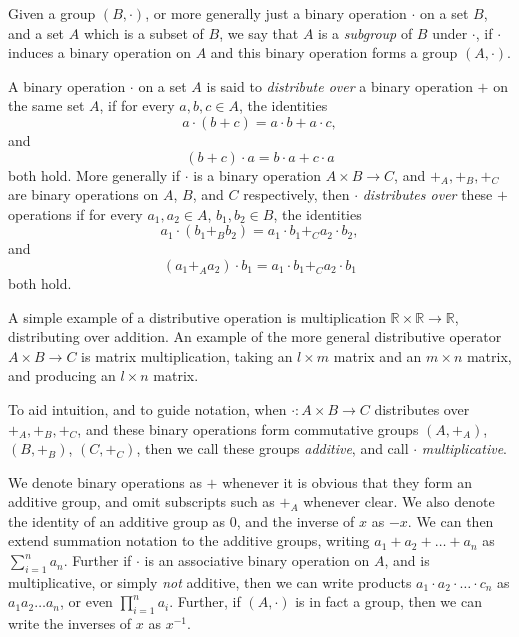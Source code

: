 \begin{define}[Subgroups] Given a group $(B, \cdot)$, or more generally just a binary operation $\cdot$ on a set $B$, and a set $A$ which is a subset of $B$, we say that $A$ is a \emph{subgroup} of $B$ under $\cdot$, if $\cdot$ induces a binary operation on $A$ and this binary operation forms a group $(A, \cdot)$.
\end{define}

\begin{define}[Distributivity] A binary operation $\cdot$ on a set $A$ is said to \emph{distribute over} a binary operation $+$ on the same set $A$, if for every $a, b, c \in A$, the identities
\[a \cdot (b + c) = a\cdot b +a\cdot c,\]
and
\[(b + c) \cdot a = b \cdot a + c \cdot a\]
both hold. More generally if $\cdot$ is a binary operation $A \times B \to C$, and $+_A, +_B, +_C$ are binary operations on $A$, $B$, and $C$ respectively, then $\cdot$ \emph{distributes over} these $+$ operations if for every $a_1, a_2 \in A$, $b_1, b_2 \in B$, the identities
\[a_1 \cdot (b_1 +_B b_2) = a_1 \cdot b_1 +_C a_2 \cdot b_2,\]
and
\[(a_1+_A a_2)\cdot b_1 = a_1 \cdot b_1 +_C a_2 \cdot b_1\]
both hold.
\end{define}

A simple example of a distributive operation is multiplication $\mathbb{R} \times \mathbb{R} \to \mathbb{R}$, distributing over addition. An example of the more general distributive operator $A \times B \to C$ is matrix multiplication, taking an $l \times m$ matrix and an $m \times n$ matrix, and producing an $l \times n$ matrix.

\begin{define} To aid intuition, and to guide notation, when $\cdot: A \times B \to C$ distributes over $+_A, +_B, +_C$, and these binary operations form commutative groups $(A, +_A)$, $(B, +_B)$, $(C, +_C)$, then we call these groups \emph{additive}, and call $\cdot$ \emph{multiplicative}.
\end{define}

We denote binary operations as $+$ whenever it is obvious that they form an additive group, and omit subscripts such as $+_A$ whenever clear. We also denote the identity of an additive group as $0$, and the inverse of $x$ as $-x$. We can then extend summation notation to the additive groups, writing $a_1 + a_2 + \dots + a_n$ as $\sum_{i=1}^n a_n$. Further if $\cdot$ is an associative binary operation on $A$, and is multiplicative, or simply \emph{not} additive, then we can write products $a_1 \cdot a_2 \cdot \dots \cdot c_n$ as $a_1a_2 \dots a_n$, or even $\prod_{i=1}^n a_i$. Further, if $(A, \cdot)$ is in fact a group, then we can write the inverses of $x$ as $x^{-1}$.

